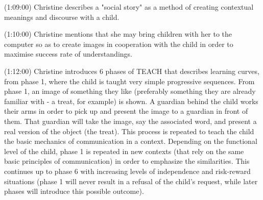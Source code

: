 (1:09:00) Christine describes a "social story" as a method of creating contextual meanings and discourse with a child.

(1:10:00) Christine mentions that she may bring children with her to the computer so as to create images in cooperation with the child in order to maximise success rate of understandings.

(1:12:00) Christine introduces 6 phases of TEACH that describes learning curves, from phase 1, where the child is taught very simple progressive sequences. From phase 1, an image of something they like (preferably something they are already familiar with - a treat, for example) is shown. A guardian behind the child works their arms in order to pick up and present the image to a guardian in front of them. That guardian will take the image, say the associated word, and present a real version of the object (the treat). This process is repeated to teach the child the basic mechanics of communication in a context. Depending on the functional level of the child, phase 1 is repeated in new contexts (that rely on the same basic principles of communication) in order to emphasize the similarities. This continues up to phase 6 with increasing levels of independence and risk-reward situations (phase 1 will never result in a refusal of the child's request, while later phases will introduce this possible outcome).